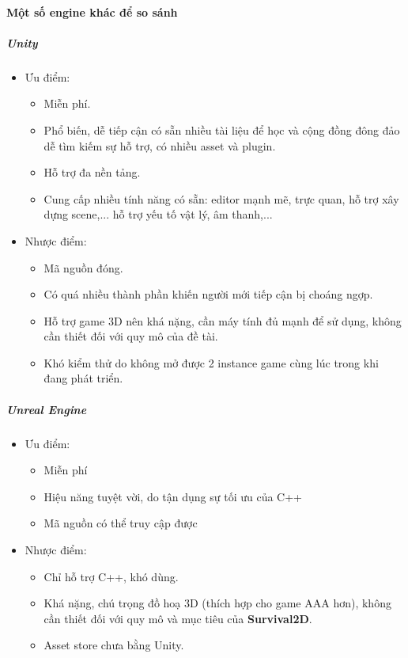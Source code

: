 \documentclass[12pt,a4paper]{article}
\begin{document}
  \paragraph{Một số engine khác để so sánh}
  \subparagraph{Unity}
  \begin{itemize}
      \item Ưu điểm:
      \begin{itemize}
          \item Miễn phí.
          \item Phổ biến, dễ tiếp cận có sẵn nhiều tài liệu để học và cộng đồng đông đảo dễ tìm kiếm sự hỗ trợ, có nhiều asset và plugin.
          \item Hỗ trợ đa nền tảng.
          \item Cung cấp nhiều tính năng có sẵn: editor mạnh mẽ, trực quan, hỗ trợ xây dựng scene,... hỗ trợ yếu tố vật lý, âm thanh,...
      \end{itemize}
      \item Nhược điểm:
      \begin{itemize}
          \item Mã nguồn đóng.
          \item Có quá nhiều thành phần khiến người mới tiếp cận bị choáng ngợp.
          \item Hỗ trợ game 3D nên khá nặng, cần máy tính đủ mạnh để sử dụng, không cần thiết đối với quy mô của đề tài.
          \item Khó kiểm thử do không mở được 2 instance game cùng lúc trong khi đang phát triển.
      \end{itemize}
  \end{itemize}
  \subparagraph{Unreal Engine}
  \begin{itemize}
      \item Ưu điểm:
      \begin{itemize}
          \item Miễn phí
          \item Hiệu năng tuyệt vời, do tận dụng sự tối ưu của C++
          \item Mã nguồn có thể truy cập được
      \end{itemize}
      \item Nhược điểm:
      \begin{itemize}
          \item Chỉ hỗ trợ C++, khó dùng.
          \item Khá nặng, chú trọng đồ hoạ 3D (thích hợp cho game AAA hơn), không cần thiết đối với quy mô và mục tiêu của \textbf{Survival2D}.
          \item Asset store chưa bằng Unity.
      \end{itemize}
  \end{itemize}
\end{document}
